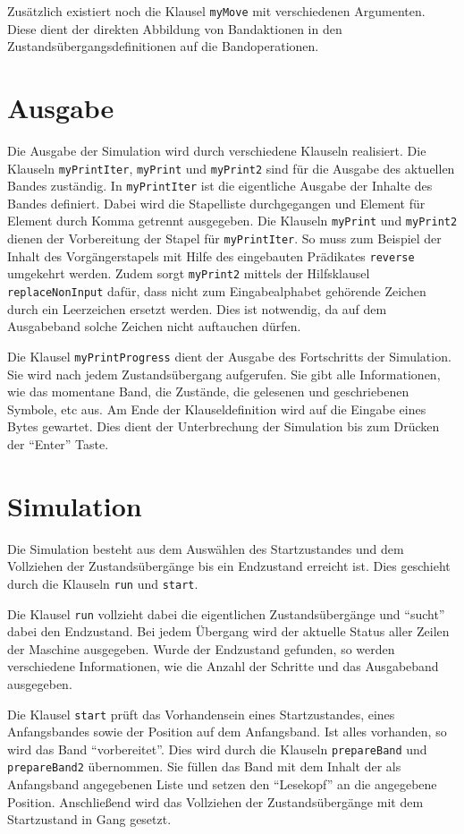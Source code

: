 \documentclass[final,a4paper,11pt,notitlepage,halfparskip]{scrreprt}
\begin{document}
Zusätzlich existiert noch die Klausel \texttt{myMove} mit verschiedenen
Argumenten. Diese dient der direkten Abbildung von Bandaktionen in den
Zustandsübergangsdefinitionen auf die Bandoperationen.

\section{Ausgabe}
Die Ausgabe der Simulation wird durch verschiedene Klauseln realisiert.
Die Klauseln \texttt{myPrintIter}, \texttt{myPrint} und
\texttt{myPrint2} sind für die Ausgabe des aktuellen Bandes zuständig.
In \texttt{myPrintIter} ist die eigentliche Ausgabe der Inhalte des
Bandes definiert. Dabei wird die Stapelliste durchgegangen und Element
für Element durch Komma getrennt ausgegeben. Die Klauseln
\texttt{myPrint} und \texttt{myPrint2} dienen der Vorbereitung der
Stapel für \texttt{myPrintIter}. So muss zum Beispiel der Inhalt des
Vorgängerstapels mit Hilfe des eingebauten Prädikates \texttt{reverse}
umgekehrt werden. Zudem sorgt \texttt{myPrint2} mittels der Hilfsklausel
\texttt{replaceNonInput} dafür, dass nicht zum Eingabealphabet gehörende
Zeichen durch ein Leerzeichen ersetzt werden. Dies ist notwendig, da auf
dem Ausgabeband solche Zeichen nicht auftauchen dürfen.

Die Klausel \texttt{myPrintProgress} dient der Ausgabe des Fortschritts
der Simulation. Sie wird nach jedem Zustandsübergang aufgerufen. Sie
gibt alle Informationen, wie das momentane Band, die Zustände, die
gelesenen und geschriebenen Symbole, etc aus. Am Ende der
Klauseldefinition wird auf die Eingabe eines Bytes gewartet. Dies dient
der Unterbrechung der Simulation bis zum Drücken der "`Enter"' Taste.

\section{Simulation}
Die Simulation besteht aus dem Auswählen des Startzustandes und dem
Vollziehen der Zustandsübergänge bis ein Endzustand erreicht ist. Dies
geschieht durch die Klauseln \texttt{run} und \texttt{start}. 

Die Klausel \texttt{run} vollzieht dabei die eigentlichen Zustandsübergänge
und "`sucht"' dabei den Endzustand. Bei jedem Übergang wird der aktuelle
Status aller Zeilen der Maschine ausgegeben. Wurde der Endzustand
gefunden, so werden verschiedene Informationen, wie die Anzahl der
Schritte und das Ausgabeband ausgegeben.

Die Klausel \texttt{start} prüft das Vorhandensein eines Startzustandes,
eines Anfangsbandes sowie der Position auf dem Anfangsband. Ist alles
vorhanden, so wird das Band "`vorbereitet"'. Dies wird durch die Klauseln
\texttt{prepareBand} und \texttt{prepareBand2} übernommen. Sie füllen
das Band mit dem Inhalt der als Anfangsband angegebenen Liste und setzen
den "`Lesekopf"' an die angegebene Position. Anschließend wird das
Vollziehen der Zustandsübergänge mit dem Startzustand in Gang gesetzt.
\end{document}
